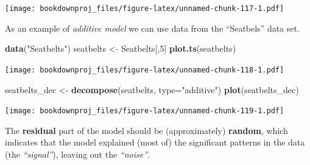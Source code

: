 \documentclass[
]{article}
\newenvironment{Shaded}{\begin{snugshade}}{\end{snugshade}}
\newcommand{\DataTypeTok}[1]{\textcolor[rgb]{0.13,0.29,0.53}{#1}}
\newcommand{\DecValTok}[1]{\textcolor[rgb]{0.00,0.00,0.81}{#1}}
\newcommand{\KeywordTok}[1]{\textcolor[rgb]{0.13,0.29,0.53}{\textbf{#1}}}
\newcommand{\NormalTok}[1]{#1}
\newcommand{\OperatorTok}[1]{\textcolor[rgb]{0.81,0.36,0.00}{\textbf{#1}}}
\newcommand{\StringTok}[1]{\textcolor[rgb]{0.31,0.60,0.02}{#1}}
\begin{document}
\texttt{[image: bookdownproj\_files/figure-latex/unnamed-chunk-117-1.pdf]}

As an example of \emph{additive model} we can use data from the ``Seatbels'' data set.

\begin{Shaded}
\begin{Highlighting}[]
\KeywordTok{data}\NormalTok{(}\StringTok{"Seatbelts"}\NormalTok{)}
\NormalTok{seatbelts <-}\StringTok{ }\NormalTok{Seatbelts[,}\DecValTok{5}\NormalTok{]}
\KeywordTok{plot.ts}\NormalTok{(seatbelts)}
\end{Highlighting}
\end{Shaded}

\texttt{[image: bookdownproj\_files/figure-latex/unnamed-chunk-118-1.pdf]}

\begin{Shaded}
\begin{Highlighting}[]
\NormalTok{seatbelts_dec <-}\StringTok{ }\KeywordTok{decompose}\NormalTok{(seatbelts, }\DataTypeTok{type=}\StringTok{"additive"}\NormalTok{)}
\KeywordTok{plot}\NormalTok{(seatbelts_dec)}
\end{Highlighting}
\end{Shaded}

\texttt{[image: bookdownproj\_files/figure-latex/unnamed-chunk-119-1.pdf]}

The \textbf{residual} part of the model should be (approximately) \textbf{random}, which indicates that the model explained (most of) the significant patterns in the data (the \emph{``signal''}), leaving out the \emph{``noise''}.

\begin{Shaded}
\end{Shaded}
\end{document}
